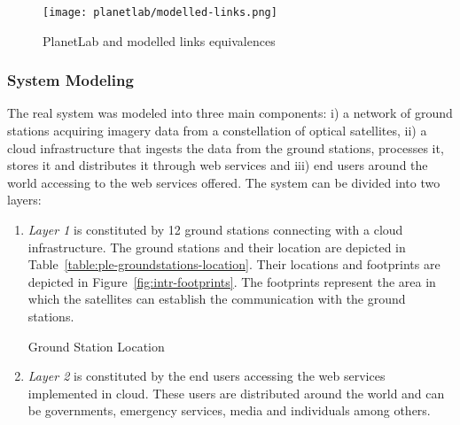 \begin{figure}[!h]
\begin{center}
\texttt{[image: planetlab/modelled-links.png]}
\caption{PlanetLab and modelled links equivalences}
\label{fig:ple-modelled-links}
\end{center}
\end{figure}


\subsubsection{System Modeling}

The real system was modeled into three main components: i) a network of ground stations acquiring imagery data from a constellation of optical satellites, ii) a cloud infrastructure that ingests the data from the ground stations, processes it, stores it and distributes it through web services and iii) end users around the world accessing to the web services offered. The system can be divided into two layers:

\begin{enumerate}

\item \emph{Layer 1} is constituted by 12 ground stations connecting with a cloud
  infrastructure. The ground stations and their location are depicted in Table~\ref{table:ple-groundstations-location}. Their locations and footprints are depicted in Figure~\ref{fig:intr-footprints}. The footprints represent the area in which the satellites can establish the communication with the ground stations.

\begin{table}[hp]
  \centering
  {\small
  
  }
  \caption{Ground Station Location}
  \label{table:ple-groundstations-location}
\end{table}



\item \emph{Layer 2} is constituted by the end users accessing the web services
  implemented in cloud. These users are distributed around the world and can be
  governments, emergency services, media and individuals among others.
\end{enumerate}

